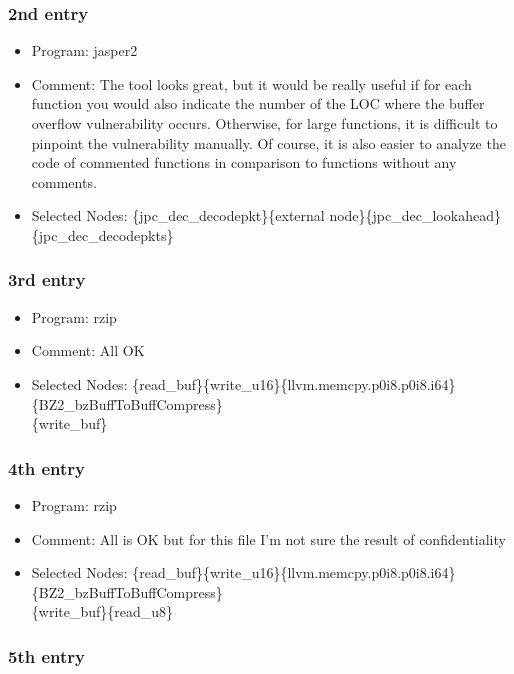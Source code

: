 \subsubsection{2nd entry}

\begin{itemize}
	\item Program: jasper2
	\item Comment: The tool looks great, but it would be really useful if for each function you would also indicate the number of the LOC where the buffer overflow vulnerability occurs. Otherwise, for large functions, it is difficult to pinpoint the vulnerability manually. Of course, it is also easier to analyze the code of commented functions in comparison to functions without any comments.
	\item Selected Nodes: \{jpc\_dec\_decodepkt\}\{external node\}\{jpc\_dec\_lookahead\}\{jpc\_dec\_decodepkts\}
\end{itemize}

\subsubsection{3rd entry}

\begin{itemize}
	\item Program: rzip
	\item Comment: All OK
	\item Selected Nodes: \{read\_buf\}\{write\_u16\}\{llvm.memcpy.p0i8.p0i8.i64\}\{BZ2\_bzBuffToBuffCompress\}\\\{write\_buf\}
\end{itemize}

\subsubsection{4th entry}

\begin{itemize}
	\item Program: rzip
	\item Comment: All is OK but for this file I'm not sure the result of confidentiality
	\item Selected Nodes: \{read\_buf\}\{write\_u16\}\{llvm.memcpy.p0i8.p0i8.i64\}\{BZ2\_bzBuffToBuffCompress\}\\\{write\_buf\}\{read\_u8\}
\end{itemize}

\subsubsection{5th entry}

